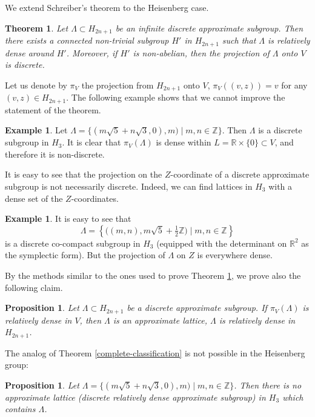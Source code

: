 \documentclass[10pt]{amsart}
\newcommand{\bR}{\mathbb{R}}
\newcommand{\bZ}{\mathbb{Z}}
\newcounter{dummy} \numberwithin{dummy}{section}
\theoremstyle{plain}
\newtheorem{prop}[dummy]{Proposition}
\newtheorem{thm}[dummy]{Theorem}
\theoremstyle{definition}
\newtheorem{example}[dummy]{Example}
\begin{document}
We extend Schreiber's theorem to the Heisenberg case.


\begin{thm}
\label{heis-thm}
Let $\Lambda \subset H_{2n+1}$ be an infinite discrete approximate subgroup. Then there exists a connected non-trivial subgroup $H'$ in $H_{2n+1}$ such that $\Lambda$ is relatively dense around $H'$. Moreover, if $H'$ is non-abelian, then the projection of $\Lambda$ onto $V$ is discrete.
\end{thm}


Let us denote by $\pi_V$ the projection from $H_{2n+1}$ onto $V$, \ie $\pi_V((v,z)) = v$ for any $(v,z) \in H_{2n+1}$. The following example shows that we cannot improve the statement of the theorem.

\begin{example}
Let $\Lambda = \{(m\sqrt{5} + n \sqrt{3},0), m) \mid m,n \in \bZ\}$. Then $\Lambda$ is a discrete subgroup in $H_3$. It is clear that $\pi_V(\Lambda)$ is dense within $L = \bR \times \{0\} \subset V$, and therefore it is non-discrete.
\end{example}

It is easy to see that the projection on the $Z$-coordinate of a discrete approximate subgroup is not necessarily discrete. Indeed, we can find lattices in $H_3$ with a dense set of the $Z$-coordinates.

\begin{example}
It is easy to see that
\[
\Lambda = \left\{ \bigl((m,n), m\sqrt{5} + \tfrac{1}{2} \bZ\bigr) \mid m,n \in \bZ \right\}
\]
is a discrete co-compact subgroup in $H_3$ (equipped with the determinant on $\bR^2$ as the symplectic form). But the projection of $\Lambda$ on $Z$ is everywhere dense.
\end{example}

By the methods similar to the ones used to prove Theorem \ref{heis-thm}, we prove also the following claim.

\begin{prop}
\label{heis-prop}
Let $\Lambda \subset H_{2n+1}$ be a discrete approximate subgroup. If $\pi_V(\Lambda)$ is relatively dense in $V$, then $\Lambda$ is an approximate lattice, \ie $\Lambda$ is relatively dense in $H_{2n+1}$.
\end{prop}

The analog of Theorem \ref{complete-classification} is not possible in the Heisenberg group:

\begin{prop}
\label{ful-class-impossible}
Let $\Lambda = \{(m\sqrt{5} + n \sqrt{3},0), m) \mid m,n \in \bZ\}$. Then there is no approximate lattice (discrete relatively dense approximate subgroup) in $H_3$ which contains $\Lambda$.
\end{prop}
\end{document}
